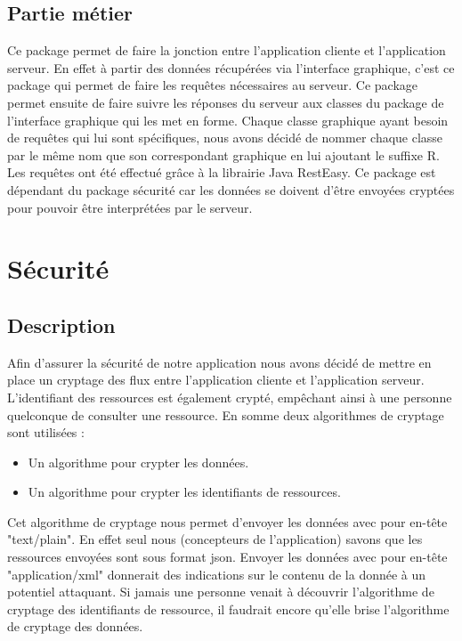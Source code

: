 \subsection{Partie métier}
Ce package permet de faire la jonction entre l'application cliente et l'application serveur. 
En effet à partir des données récupérées via l'interface graphique, c'est ce package qui permet de faire les requêtes nécessaires au serveur. Ce package permet ensuite de faire suivre les réponses du serveur aux classes du package de l'interface graphique qui les met en forme.
Chaque classe graphique ayant besoin de requêtes qui lui sont spécifiques, nous avons décidé de nommer chaque classe par le même nom que son correspondant graphique en lui ajoutant le suffixe R. \\
Les requêtes ont été effectué grâce à la librairie Java RestEasy.
Ce package est dépendant du package sécurité car les données se doivent d'être envoyées cryptées pour pouvoir être interprétées par le serveur.\\


\newpage
\section{Sécurité}

\subsection{Description}
Afin d'assurer la sécurité de notre application nous avons décidé de mettre en place un cryptage des flux entre l'application cliente et l'application serveur.
L’identifiant des ressources est également crypté, empêchant ainsi à une personne quelconque de consulter une ressource.
En somme deux algorithmes de cryptage sont utilisées : 
\begin{itemize}
\item Un algorithme pour crypter les données.
\item Un algorithme pour crypter les identifiants de ressources.
\end{itemize}
Cet algorithme de cryptage nous permet d'envoyer les données avec pour en-tête "text/plain". 
En effet seul nous (concepteurs de l'application) savons que les ressources envoyées sont sous format json. Envoyer les données avec pour en-tête "application/xml" donnerait des indications sur le contenu de la donnée à un potentiel attaquant.
Si jamais une personne venait à découvrir l'algorithme de cryptage des identifiants de ressource, il faudrait encore qu'elle brise l'algorithme de cryptage des données.

